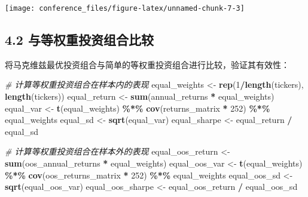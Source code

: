 \documentclass[
]{article}
\newenvironment{Shaded}{\begin{snugshade}}{\end{snugshade}}
\newcommand{\CommentTok}[1]{\textcolor[rgb]{0.56,0.35,0.01}{\textit{#1}}}
\newcommand{\DecValTok}[1]{\textcolor[rgb]{0.00,0.00,0.81}{#1}}
\newcommand{\FunctionTok}[1]{\textcolor[rgb]{0.13,0.29,0.53}{\textbf{#1}}}
\newcommand{\NormalTok}[1]{#1}
\newcommand{\OtherTok}[1]{\textcolor[rgb]{0.56,0.35,0.01}{#1}}
\newcommand{\SpecialCharTok}[1]{\textcolor[rgb]{0.81,0.36,0.00}{\textbf{#1}}}
\begin{document}
\begin{center}\texttt{[image: conference\_files/figure-latex/unnamed-chunk-7-3]} \end{center}

\subsection{4.2
与等权重投资组合比较}\label{ux4e0eux7b49ux6743ux91cdux6295ux8d44ux7ec4ux5408ux6bd4ux8f83}

将马克维兹最优投资组合与简单的等权重投资组合进行比较，验证其有效性：

\begin{Shaded}
\begin{Highlighting}[]
\CommentTok{\# 计算等权重投资组合在样本内的表现}
\NormalTok{equal\_weights }\OtherTok{\textless{}{-}} \FunctionTok{rep}\NormalTok{(}\DecValTok{1}\SpecialCharTok{/}\FunctionTok{length}\NormalTok{(tickers), }\FunctionTok{length}\NormalTok{(tickers))}
\NormalTok{equal\_return }\OtherTok{\textless{}{-}} \FunctionTok{sum}\NormalTok{(annual\_returns }\SpecialCharTok{*}\NormalTok{ equal\_weights)}
\NormalTok{equal\_var }\OtherTok{\textless{}{-}} \FunctionTok{t}\NormalTok{(equal\_weights) }\SpecialCharTok{\%*\%} \FunctionTok{cov}\NormalTok{(returns\_matrix }\SpecialCharTok{*} \DecValTok{252}\NormalTok{) }\SpecialCharTok{\%*\%}\NormalTok{ equal\_weights}
\NormalTok{equal\_sd }\OtherTok{\textless{}{-}} \FunctionTok{sqrt}\NormalTok{(equal\_var)}
\NormalTok{equal\_sharpe }\OtherTok{\textless{}{-}}\NormalTok{ equal\_return }\SpecialCharTok{/}\NormalTok{ equal\_sd}

\CommentTok{\# 计算等权重投资组合在样本外的表现}
\NormalTok{equal\_oos\_return }\OtherTok{\textless{}{-}} \FunctionTok{sum}\NormalTok{(oos\_annual\_returns }\SpecialCharTok{*}\NormalTok{ equal\_weights)}
\NormalTok{equal\_oos\_var }\OtherTok{\textless{}{-}} \FunctionTok{t}\NormalTok{(equal\_weights) }\SpecialCharTok{\%*\%} \FunctionTok{cov}\NormalTok{(oos\_returns\_matrix }\SpecialCharTok{*} \DecValTok{252}\NormalTok{) }\SpecialCharTok{\%*\%}\NormalTok{ equal\_weights}
\NormalTok{equal\_oos\_sd }\OtherTok{\textless{}{-}} \FunctionTok{sqrt}\NormalTok{(equal\_oos\_var)}
\NormalTok{equal\_oos\_sharpe }\OtherTok{\textless{}{-}}\NormalTok{ equal\_oos\_return }\SpecialCharTok{/}\NormalTok{ equal\_oos\_sd}


\end{Highlighting}
\end{Shaded}
\end{document}
